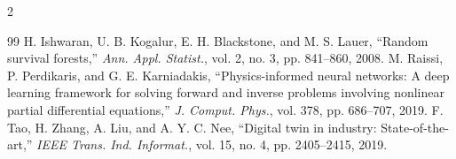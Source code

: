 \begin{multicols}{2}
\begin{thebibliography}{99}
 H. Ishwaran, U. B. Kogalur, E. H. Blackstone, and M. S. Lauer, ``Random survival forests,'' \emph{Ann. Appl. Statist.}, vol. 2, no. 3, pp. 841–860, 2008.
 M. Raissi, P. Perdikaris, and G. E. Karniadakis, ``Physics-informed neural networks: A deep learning framework for solving forward and inverse problems involving nonlinear partial differential equations,'' \emph{J. Comput. Phys.}, vol. 378, pp. 686–707, 2019.
 F. Tao, H. Zhang, A. Liu, and A. Y. C. Nee, ``Digital twin in industry: State-of-the-art,'' \emph{IEEE Trans. Ind. Informat.}, vol. 15, no. 4, pp. 2405–2415, 2019.
\end{thebibliography}
\endgroup
\end{multicols}
